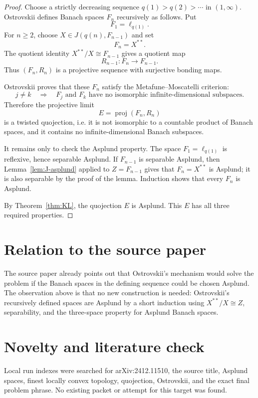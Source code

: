 \documentclass[11pt]{article}
\begin{document}
\begin{proof}
Choose a strictly decreasing sequence \(q(1)>q(2)>\cdots\) in \((1,\infty)\).
Ostrovskii defines Banach spaces \(F_n\) recursively as follows.  Put
\[
F_1=\ell_{q(1)}.
\]
For \(n\ge 2\), choose \(X\in J(q(n),F_{n-1})\) and set
\[
F_n=X^{**}.
\]
The quotient identity \(X^{**}/X\cong F_{n-1}\) gives a quotient map
\[
R_{n-1}:F_n\longrightarrow F_{n-1}.
\]
Thus \((F_n,R_n)\) is a projective sequence with surjective bonding maps.

Ostrovskii proves that these \(F_n\) satisfy the Metafune--Moscatelli
criterion:
\[
j\ne k
\quad\Longrightarrow\quad
F_j\text{ and }F_k\text{ have no isomorphic infinite-dimensional subspaces}.
\]
Therefore the projective limit
\[
E=\operatorname{proj}(F_n,R_n)
\]
is a twisted quojection, i.e. it is not isomorphic to a countable product of
Banach spaces, and it contains no infinite-dimensional Banach subspaces.

It remains only to check the Asplund property.  The space \(F_1=\ell_{q(1)}\)
is reflexive, hence separable Asplund.  If \(F_{n-1}\) is separable Asplund,
then Lemma~\ref{lem:J-asplund} applied to \(Z=F_{n-1}\) gives that
\(F_n=X^{**}\) is Asplund; it is also separable by the proof of the lemma.
Induction shows that every \(F_n\) is Asplund.

By Theorem~\ref{thm:KL}, the quojection \(E\) is Asplund.  This \(E\) has all
three required properties.
\end{proof}

\section*{Relation to the source paper}

The source paper already points out that Ostrovskii's mechanism would solve
the problem if the Banach spaces in the defining sequence could be chosen
Asplund.  The observation above is that no new construction is needed:
Ostrovskii's recursively defined spaces are Asplund by a short induction using
\(X^{**}/X\cong Z\), separability, and the three-space property for Asplund
Banach spaces.

\section*{Novelty and literature check}

Local run indexes were searched for arXiv:2412.11510, the source title,
Asplund spaces, finest locally convex topology, quojection, Ostrovskii, and the
exact final problem phrase.  No existing packet or attempt for this target was
found.
\end{document}
